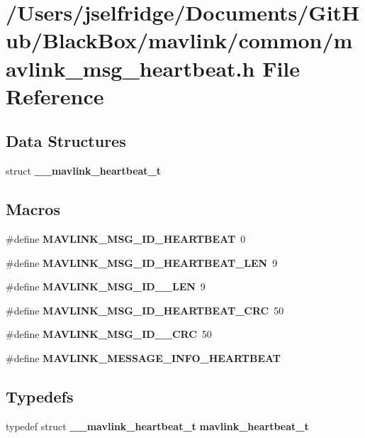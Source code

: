 \section{/\+Users/jselfridge/\+Documents/\+Git\+Hub/\+Black\+Box/mavlink/common/mavlink\+\_\+msg\+\_\+heartbeat.h File Reference}
\label{common_2mavlink__msg__heartbeat_8h}
\subsection*{Data Structures}
\begin{DoxyCompactItemize}
\item 
struct \textbf{ \+\_\+\+\_\+mavlink\+\_\+heartbeat\+\_\+t}
\end{DoxyCompactItemize}
\subsection*{Macros}
\begin{DoxyCompactItemize}
\item 
\#define \textbf{ M\+A\+V\+L\+I\+N\+K\+\_\+\+M\+S\+G\+\_\+\+I\+D\+\_\+\+H\+E\+A\+R\+T\+B\+E\+AT}~0
\item 
\#define \textbf{ M\+A\+V\+L\+I\+N\+K\+\_\+\+M\+S\+G\+\_\+\+I\+D\+\_\+\+H\+E\+A\+R\+T\+B\+E\+A\+T\+\_\+\+L\+EN}~9
\item 
\#define \textbf{ M\+A\+V\+L\+I\+N\+K\+\_\+\+M\+S\+G\+\_\+\+I\+D\+\_\+\_\+\+L\+EN}~9
\item 
\#define \textbf{ M\+A\+V\+L\+I\+N\+K\+\_\+\+M\+S\+G\+\_\+\+I\+D\+\_\+\+H\+E\+A\+R\+T\+B\+E\+A\+T\+\_\+\+C\+RC}~50
\item 
\#define \textbf{ M\+A\+V\+L\+I\+N\+K\+\_\+\+M\+S\+G\+\_\+\+I\+D\+\_\+\_\+\+C\+RC}~50
\item 
\#define \textbf{ M\+A\+V\+L\+I\+N\+K\+\_\+\+M\+E\+S\+S\+A\+G\+E\+\_\+\+I\+N\+F\+O\+\_\+\+H\+E\+A\+R\+T\+B\+E\+AT}
\end{DoxyCompactItemize}
\subsection*{Typedefs}
\begin{DoxyCompactItemize}
\item 
typedef struct \textbf{ \+\_\+\+\_\+mavlink\+\_\+heartbeat\+\_\+t} \textbf{ mavlink\+\_\+heartbeat\+\_\+t}
\end{DoxyCompactItemize}


